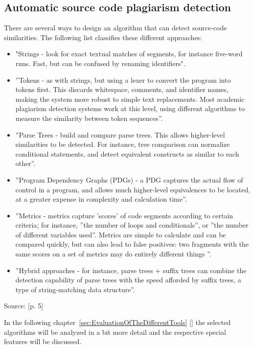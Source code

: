 \documentclass[a4paper, 11pt]{article}
\renewcommand{\\}{\vspace*{0.5\baselineskip} \newline}
\begin{document}
\subsection{Automatic source code plagiarism detection}

There are several ways to design an algorithm that can detect source-code similarities. The following list classifies these different approaches:

\begin{itemize}
	\item "Strings - look for exact textual matches of segments, for instance five-word runs. Fast, but can be confused by renaming identifiers".
	\item ”Tokens - as with strings, but using a lexer to convert the program into tokens first. This discards whitespace, comments, and identifier names, making the system more robust to simple text replacements. Most academic plagiarism detection systems work at this level, using different algorithms to measure the similarity between token sequences”.
	\item ”Parse Trees - build and compare parse trees. This allows higher-level similarities to be detected. For instance, tree comparison can normalize conditional statements, and detect equivalent constructs as similar to each other”.
	\item ”Program Dependency Graphs (PDGs) - a PDG captures the actual flow of control in a program, and allows much higher-level equivalences to be located, at a greater expense in complexity and calculation time”.
	\item ”Metrics - metrics capture ’scores’ of code segments according to certain criteria; for instance, ”the number of loops and conditionals”, or ”the number of different variables used”. Metrics are simple to calculate and can be compared quickly, but can also lead to false positives: two fragments with the same scores on a set of metrics may do entirely different things ”.
	\item ”Hybrid approaches - for instance, parse trees + suffix trees can combine the detection capability of parse trees with the speed afforded by suffix trees, a type of string-matching data structure”.
\end{itemize}
Source: \autocite{OaCoPDT}[p. 5]

In the following chapter~\ref{sec:EvaluationOfTheDifferentTools} [] the selected algorithms will be analyzed in a bit more detail and the respective special features will be discussed.
\end{document}
